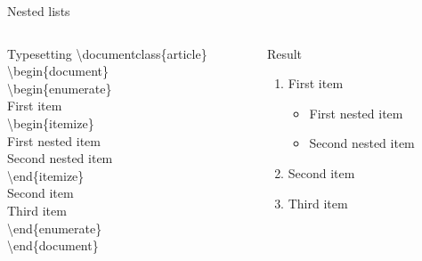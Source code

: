 \documentclass[10pt,xcolor={dvipsnames}]{beamer}
\begin{document}
		\begin{frame}{Nested lists}
			\begin{columns}[T]
				
				\begin{column}{.5 \textwidth}
					\onslide<2->
					\begin{block}{Typesetting}
						\textbackslash documentclass\{{\color{blue}article}\}\\
						
						\textbackslash begin\{{\color{blue}document}\}\\
						
						\quad \textbackslash begin\{{\color{orange}enumerate}\}\\
							 First item\\
							
								\quad\qquad \textbackslash begin\{{\color{orange}itemize}\}\\
								\qquad\qquad {\color{orange}\textbackslash item} First nested item\\
								\qquad{} Second nested item\\
								\quad\qquad \textbackslash end\{{\color{orange}itemize}\}\\
							
							 Second item\\
							\qquad {\color{orange}\textbackslash item} Third item\\
						\quad \textbackslash end\{{\color{orange}enumerate}\}\\
						
						\textbackslash end\{{\color{blue}document}\}
					\end{block}
				\end{column}
				
				\begin{column}{.5 \textwidth}
					\onslide<3->
					\begin{block}{Result}
						\begin{enumerate}
							\item First item
							\begin{itemize}
								\item First nested item
								\item Second nested item
							\end{itemize}
							\item Second item
							\item Third item
						\end{enumerate}
					\end{block}
				\end{column}
				
			\end{columns}
		\end{frame}
	
\end{document}
